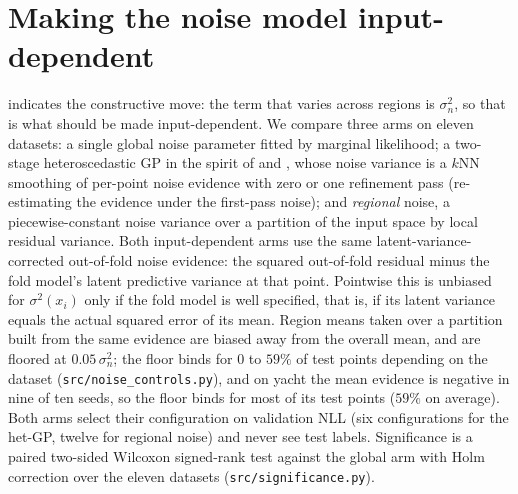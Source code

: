 \documentclass[11pt]{article}
\newcommand{\ece}{\mathrm{ECE}}
\begin{document}
\section{Making the noise model input-dependent}
\label{sec:noise}

 indicates the constructive move: the term that varies across regions is
$\sigma_n^2$, so that is what should be made input-dependent. We compare three arms on
eleven datasets: a single global noise parameter fitted by marginal likelihood; a
two-stage heteroscedastic GP in the spirit of \citet{goldberg1997} and
\citet{kersting2007}, whose noise variance is a $k$NN smoothing of per-point noise
evidence with zero or one refinement pass (re-estimating the evidence under the
first-pass noise); and \emph{regional} noise, a piecewise-constant noise variance over
a partition of the input space by local residual variance. Both input-dependent arms
use the same latent-variance-corrected out-of-fold noise evidence: the squared
out-of-fold residual minus the fold model's latent predictive variance at that point.
Pointwise this is unbiased for $\sigma^2(x_i)$ only if the fold model is well
specified, that is, if its latent variance equals the actual squared error of its mean.
Region means taken over a partition built from the same evidence are biased away from
the overall mean, and are floored at $0.05\,\sigma_n^2$; the floor binds for $0$ to
$59\%$ of test points depending on the dataset (\texttt{src/noise\_controls.py}), and
on yacht the mean evidence is negative in nine of ten seeds, so the floor binds for
most of its test points ($59\%$ on average). Both arms select their configuration on
validation NLL (six configurations for the het-GP, twelve for regional noise) and never
see test labels. Significance is a paired two-sided Wilcoxon signed-rank test against
the global arm with Holm correction over the eleven datasets (\texttt{src/significance.py}).

\begin{table}[h]\centering
\caption{$\ece$ by noise model, seeds $0$--$9$, ordered by het ratio relative to its
permutation null (\cref{tab:screen}). $^{\uparrow}$/$^{\downarrow}$: better/worse than
global noise at Holm-adjusted $p<0.05$ over the eleven datasets. Generated by
\texttt{src/hetero\_fair.py}, \texttt{src/significance.py} and
\texttt{src/paper\_tables.py}.}
\label{tab:noise}
\small

\end{table}
\end{document}
